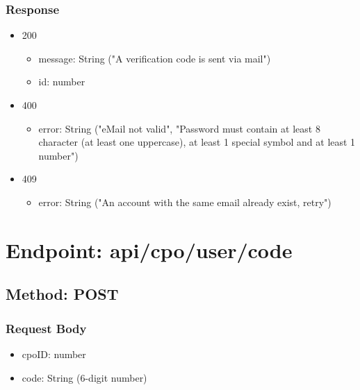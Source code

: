 \subsubsection*{Response}
\begin{itemize}
    \item 200
          \begin{itemize}
              \item message: String ("A verification code is sent via mail")
              \item id: number
          \end{itemize}
    \item 400
          \begin{itemize}
              \item error: String ("eMail not valid", "Password must contain at least 8 character (at least one uppercase), at least 1 special symbol and at least 1 number")
          \end{itemize}
    \item 409
          \begin{itemize}
              \item error: String ("An account with the same email already exist, retry")
          \end{itemize}
\end{itemize}

\section*{Endpoint: api/cpo/user/code}
\subsection*{Method: POST}
\subsubsection*{Request Body}
\begin{itemize}
    \item cpoID: number
    \item code: String (6-digit number)
\end{itemize}
